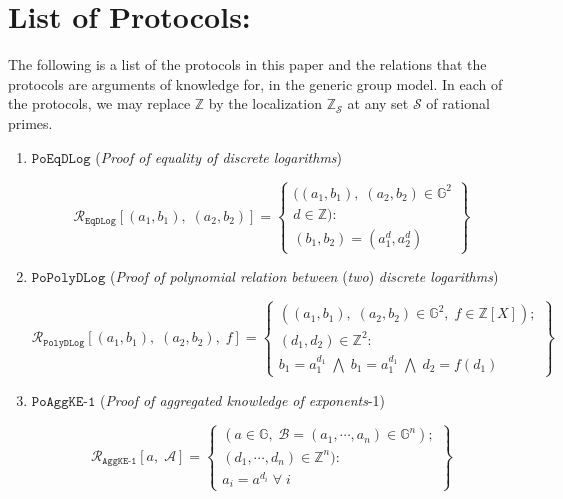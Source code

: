 \documentclass[11pt, lettersize, notitlepage, leqno, footskip=0.6cm]{article}
\newcommand{\bz}{\mathbb Z}
\newcommand{\ttt}{\texttt}
\newcommand{\mc}{\mathcal}
\newcommand{\mb}{\mathbb}
\numberwithin{equation}{section}
\begin{document}
{\section{\fontsize{12}{12}\selectfont List of Protocols:}

The following is a list of the protocols in this paper and the relations that the protocols are arguments of knowledge for, in the generic group model. In each of the protocols, we may replace $\bz$ by the localization $\bz_{\mc{S}}$ at any set $\mc{S}$ of rational primes.

\begin{enumerate}[wide, labelwidth=!, labelindent=0pt]

\item $\ttt{PoEqDLog}$ (\textit{Proof of equality of discrete logarithms}) \vspace{-0.3cm}

\[
  \mc{R}_{{\ttt{EqDLog}}}[(a_1, b_1),\;(a_2,b_2)] = \left\{\begin{array}{l}
    ((a_1, b_1), \; (a_2,b_2)\in\mb{G}^2\\
    d\in\mb{Z}): \\
    (b_1,b_2) = (a_1^d,a_2^d)
  \end{array}\right\}
\]

 

\item $\ttt{PoPolyDLog}$ (\textit{Proof of polynomial relation between} (\textit{two}) \textit{discrete logarithms})\vspace{-0.3cm}

\[
  \mc{R}_{{\ttt{PolyDLog}}}[(a_1, b_1),\;(a_2,b_2),\;f] = \left\{\begin{array}{l}
    ((a_1, b_1), \; (a_2,b_2)\in\mb{G}^2,\;f\in\bz[X]);\\
    (d_1, d_2)\in\mb{Z}^2: \\
    b_1 = a_1^{d_1}\; \bigwedge\; b_1 = a_1^{d_1}\; \bigwedge \;d_2 = f(d_1)
  \end{array}\right\}
\]

\item $\ttt{PoAggKE-1}$ (\textit{Proof of aggregated knowledge of exponents}-1) \vspace{-0.3cm}

\[
  \mc{R}_{{\ttt{AggKE-1}}}[a,\; \mc{A}] = \left\{\begin{array}{l}
    (a\in\mb{G},\; \mc{B} = (a_1,\cdots, a_n)\in\mb{G}^n);\\ 
    (d_1,\cdots,d_n)\in\bz^n):  \\
    a_i = a^{d_i}\;\forall\; i
  \end{array}\right\}
\]


\end{enumerate}}
\end{document}
